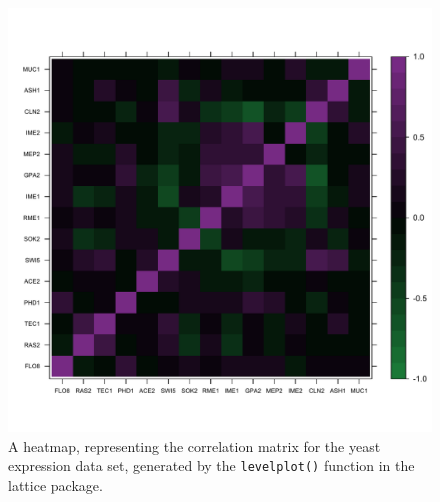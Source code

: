 \begin{figure}[htbp]
\centering
\includegraphics[width=0.5\columnwidth]{./figures/hands-on3/corr-heatmap.pdf}
\caption{A heatmap, representing the correlation matrix for the yeast expression data set, generated by the \lstinline!levelplot()! function in the lattice package.\label{fig:corrheat}}
\end{figure}

